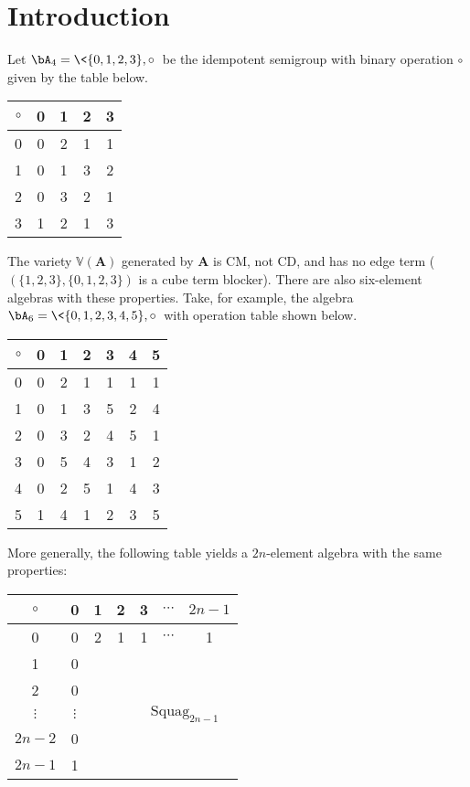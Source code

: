 \section{Introduction}
\begin{example}
  \label{four-elt-grpd}
Let $\bA_4 = \<\{0,1,2,3\}, \circ\>$ be the idempotent semigroup with binary operation $\circ$ given by the table below.
\vskip3mm
 \begin{center}
 \begin{tabular}{c|cccc}
      $\circ$ & 0 & 1 & 2 & 3\\
      \hline
      0 & 0 & 2 & 1 & 1\\
      1 & 0 & 1 & 3 & 2\\
      2 & 0 & 3 &2 & 1\\
      3 & 1 & 2 & 1 & 3
    \end{tabular}
 \end{center}
\vskip3mm

The variety $\mathbb{V}(\mathbf A)$ generated by $\mathbf A$ is CM, not CD, and has no edge term ($(\{1,2,3\},  \{0,1,2,3\})$ is a cube term blocker).
There are also six-element algebras with these properties. Take, for example, the algebra $\bA_6 = \<\{0,1,2,3,4,5\}, \circ\>$ with operation table shown below.
\vskip3mm
 \begin{center}
 \begin{tabular}{c|cccccc}
      $\circ$ & 0 & 1 & 2 & 3 & 4 & 5\\
      \hline
      0 & 0 & 2 & 1 & 1 & 1 & 1\\
      1 & 0 & 1 & 3 & 5 & 2 & 4\\
      2 & 0 & 3 & 2 & 4 & 5 & 1\\
      3 & 0 & 5 & 4 & 3 & 1 & 2\\
      4 & 0 & 2 & 5 & 1 & 4 & 3\\
      5 & 1 & 4 & 1 & 2 & 3 & 5
    \end{tabular}
 \end{center}
\vskip3mm

More generally, the following table yields a $2n$-element algebra with the same properties:
\vskip3mm
 \begin{center}
 \begin{tabular}{c|cccccc}
      $\circ$ & 0 & 1 & 2 & 3 & $\cdots$ & $2n-1$\\
      \hline
            0 & 0      & 2 & 1 & 1 & $\cdots$ & 1\\
            1 & 0      &   &   &   &        & \\
            2 & 0      &   &   &   &        & \\
       $\vdots$ & $\vdots$ &  && \multicolumn{3}{c}{$\mathrm{Squag}_{2n-1}$}          \\
         $2n-2$ & 0      &   &   &   &        & \\
         $2n-1$ & 1      &   &   &   &        & 
    \end{tabular}
 \end{center}



\end{example}
